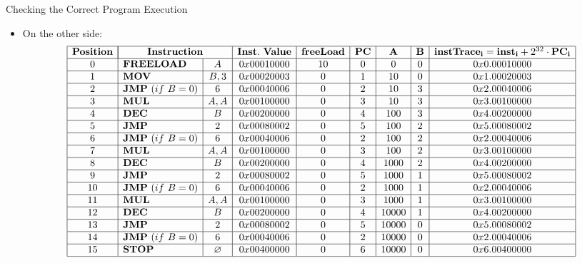 \begin{frame}[allowframebreaks]{Checking the Correct Program Execution}
\begin{itemize}
\item On the other side:
\scriptsize
\[
\begin{array}{|c|l|c|c|c|c|c|c|c|}
\hline
\mathbf{Position} & \multicolumn{2}{|c|}{\mathbf{Instruction}} & \mathbf{Inst.~Value} & \mathbf{freeLoad} & \mathbf{PC} & \mathbf{A} & \mathbf{B} &  \mathbf{instTrace_i} = \mathbf{inst_i} + 2^{32} \cdot \mathbf{PC_i} \\ \hline
0 & \mathbf{FREELOAD} & A & 0x00010000 & 10 & 0 & 0 & 0 & 0x0.00010000 \\ \hline
1 & \mathbf{MOV} & B, 3 & 0x00020003 & 0 & 1 & 10 & 0 & 0x1.00020003 \\ \hline
2 & \mathbf{JMP}~(if~B = 0) & 6 & 0x00040006 & 0 & 2 & 10 & 3 & 0x2.00040006 \\ \hline
3 & \mathbf{MUL} & A, A & 0x00100000 & 0 & 3 & 10 & 3 & 0x3.00100000 \\ \hline
4 & \mathbf{DEC} & B & 0x00200000 & 0 & 4 & 100 & 3 & 0x4.00200000 \\ \hline
5 & \mathbf{JMP} & 2 & 0x00080002 & 0 & 5 & 100 & 2 & 0x5.00080002 \\ \hline
6 & \mathbf{JMP}~(if~B = 0) & 6 & 0x00040006 & 0 & 2 & 100 & 2 & 0x2.00040006 \\ \hline
7 & \mathbf{MUL} & A, A & 0x00100000 & 0 & 3 & 100 & 2 & 0x3.00100000 \\ \hline
8 & \mathbf{DEC} & B & 0x00200000 & 0 & 4 & 1000 & 2 & 0x4.00200000 \\ \hline
9 & \mathbf{JMP} & 2 & 0x00080002 & 0 & 5 & 1000 & 1 & 0x5.00080002 \\ \hline
10 & \mathbf{JMP}~(if~B = 0) & 6 & 0x00040006 & 0 & 2 & 1000 & 1 & 0x2.00040006 \\ \hline
11 & \mathbf{MUL} & A, A & 0x00100000 & 0 & 3 & 1000 & 1 & 0x3.00100000 \\ \hline
12 & \mathbf{DEC} & B & 0x00200000 & 0 & 4 & 10000 & 1 & 0x4.00200000 \\ \hline
13 & \mathbf{JMP} & 2 & 0x00080002 & 0 & 5 & 10000 & 0 & 0x5.00080002 \\ \hline
14 & \mathbf{JMP}~(if~B = 0) & 6 & 0x00040006 & 0 & 2 & 10000 & 0 & 0x2.00040006 \\ \hline
15 & \mathbf{STOP} & \emptyset & 0x00400000 & 0 & 6 & 10000 & 0 & 0x6.00400000 \\ \hline
\end{array}
\]
\end{itemize}
\end{frame}
